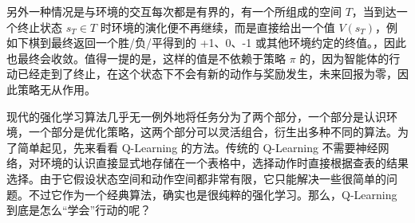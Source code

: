 另外一种情况是与环境的交互每次都是有界的，有一个所组成的空间 $T$，当到达一个终止状态 $s_T \in T$ 时环境的演化便不再继续，而是直接给出一个值 $V(s_T)$，例如下棋到最终返回一个胜/负/平得到的 +1、0、-1 或其他环境约定的终值。，因此也最终会收敛。值得一提的是，这样的值是不依赖于策略 $\pi$ 的，因为智能体的行动已经走到了终止，在这个状态下不会有新的动作与奖励发生，未来回报为零，因此策略无从作用。

现代的强化学习算法几乎无一例外地将任务分为了两个部分，一个部分是认识环境，一个部分是优化策略，这两个部分可以灵活组合，衍生出多种不同的算法。为了简单起见，先来看看 Q-Learning 的方法。传统的 Q-Learning 不需要神经网络，对环境的认识直接显式地存储在一个表格中，选择动作时直接根据查表的结果选择。由于它假设状态空间和动作空间都非常有限，它只能解决一些很简单的问题。不过它作为一个经典算法，确实也是很纯粹的强化学习。那么，Q-Learning 到底是怎么“学会”行动的呢？

\newpage